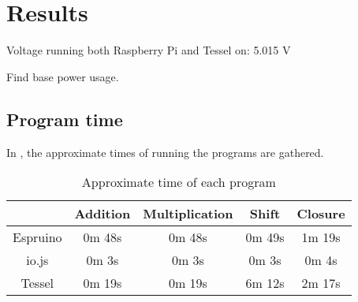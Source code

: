 \chapter{Results}
\label{ch:chapter3}

Voltage running both Raspberry Pi and Tessel on: 5.015 V

Find base power usage.

\section{Program time}
In , the approximate times of running the programs are gathered.
\begin{table}[h]
\centering
\begin{tabular}{| c | c | c | c | c |}
 \hline
 & Addition & Multiplication & Shift & Closure \\ \hline
 Espruino &  0m 48s & 0m 48s & 0m 49s & 1m 19s \\ \hline
 io.js  & 0m 3s & 0m 3s & 0m 3s & 0m 4s \\ \hline
 Tessel & 0m 19s & 0m 19s & 6m 12s & 2m 17s\\ \hline
 
\end{tabular}
\caption{Approximate time of each program}
\label{tab:timedruns}
\end{table}



 

 

 

